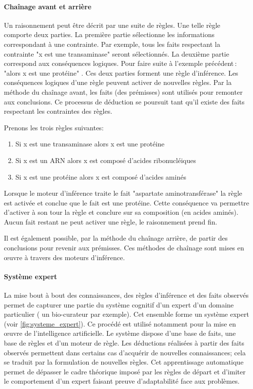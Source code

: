 \begin{refsegment}
    \paragraph{Chaînage avant et arrière} %
    Un raisonnement peut être décrit par une suite de règles. Une telle règle comporte deux parties. La première partie sélectionne les informations correspondant à une contrainte. Par exemple, tous les faits respectant la contrainte "x est une transaminase" seront sélectionnés. La deuxième partie correspond aux conséquences logiques. Pour faire suite à l'exemple précédent : "alors x est une protéine" . Ces deux parties forment une règle d'inférence. Les conséquences logiques d'une règle peuvent activer de nouvelles règles. Par la méthode du chaînage avant, les faits (des prémisses) sont utilisés pour remonter aux conclusions. Ce processus de déduction se poursuit tant qu'il existe des faits respectant les contraintes des règles.
    
    Prenons les trois règles suivantes:\nolisttopbreak    
    \begin{enumerate}
        \item Si x est une transaminase alors x est une protéine
        \item Si x est un ARN alors x est composé d'acides ribonucléiques
        \item Si x est une protéine alors x est composé d'acides aminés
    \end{enumerate}

    Lorsque le moteur d'inférence traite le fait "aspartate aminotransférase" la règle  est activée et  conclue que le fait est une protéine. Cette conséquence va permettre d'activer à son tour la règle  et conclure sur sa composition (en acides aminés). Aucun fait restant ne peut activer une règle, le raisonnement prend fin.
    
    Il est également possible, par la méthode du chaînage arrière, de partir des conclusions pour revenir aux prémisses. Ces méthodes de chaînage sont mises en œuvre à travers des moteurs d'inférence.
    
    \paragraph{Système expert}
    La mise bout à bout des connaissances, des règles d'inférence et des faits observés permet de capturer une partie du système cognitif d'un expert d'un domaine particulier ( un bio-curateur par exemple). Cet ensemble forme un système expert (voir \cref{fig:systeme_expert}). Ce procédé est utilisé notamment pour la mise en œuvre de l'intelligence artificielle. Le système dispose d'une base de faits, une base de règles et d'un moteur de règle. Les déductions réalisées à partir des faits observés permettent dans certains cas d'acquérir de nouvelles connaissances; cela se traduit par la formulation de nouvelles règles. Cet apprentissage automatique permet de dépasser le cadre théorique imposé par les règles de départ et d'imiter le comportement d'un expert faisant preuve d'adaptabilité face aux problèmes.
    

\end{refsegment}

